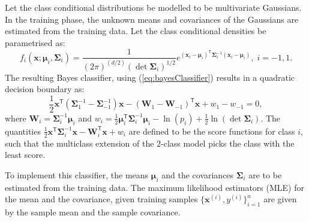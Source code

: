 \documentclass[11pt, a4 paper]{article}
\newcommand{\bx}{\mathbf{x}}
\newcommand{\bW}{\mathbf{W}}
\newcommand{\TT}{\mathsf{T}}
\newcommand{\bmu}{\boldsymbol{\mu}}
\newcommand{\bSigma}{\boldsymbol{\Sigma}}
\begin{document}
\label{prob:1.1}
Let the class conditional distributions be modelled to be multivariate Gaussians. In the training phase, the unknown means and covariances of the Gaussians are estimated from the training data. Let the class conditional densities be parametrised as:
\begin{equation}
	f_i(\bx; \bmu_i, \bSigma_i) = \frac{1}{(2\pi)^{(d/2)}(\det \bSigma_i)^{1/2}} e^{(\bx_i - \bmu_i)^\TT \bSigma_i^{-1} (\bx_i - \bmu_i)}, \; i=-1,1.
\end{equation}
The resulting Bayes classifier, using (\ref{eq:bayesClassifier}) results in a quadratic decision boundary as:
\begin{equation}
	\frac{1}{2}\bx^\TT\left( \bSigma_1^{-1} - \bSigma_{-1}^{-1} \right)\bx - (\bW_{1} - \bW_{-1})^{\TT}\bx + w_{1}-w_{-1} = 0,
\label{eq:QDA}
\end{equation}
where $\bW_{i} = \bSigma_i^{-1}\bmu_i$ and $\displaystyle w_{i} = \frac{1}{2} \bmu_i^\TT \bSigma_i^{-1} \bmu_i - \ln \left( p_{i} \right) + \frac{1}{2}\ln \left( \det \bSigma_i \right)$. The quantities $\frac{1}{2}\bx^\TT \bSigma_i^{-1} \bx - \bW_{i}^{\TT}\bx + w_{i}$ are defined to be the score functions for class $i$, such that the multiclass extension of the $2$-class model picks the class with the least score.

To implement this classifier, the means $\bmu_{i}$ and the covariances $\bSigma_{i}$ are to be estimated from the training data. The maximum likelihood estimators (MLE) for the mean and the covariance, given training samples $\{\bx^{(i)}, y^{(i)}\}_{i=1}^n$ are given by the sample mean and the sample covariance.


\label{prob:1.2}



\label{prob:1.3}


\end{document}

